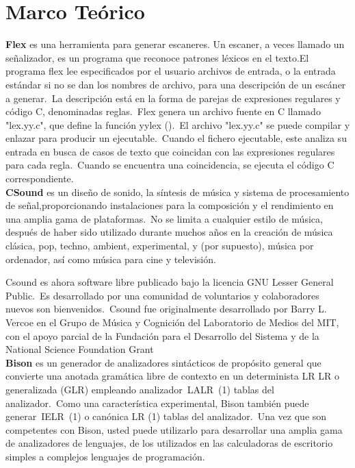 \documentclass[12pt]{article}
\begin{document}
\section{Marco Teórico}
{\bf Flex} es una herramienta para generar escaneres. Un escaner, a veces llamado un señalizador, es un programa que reconoce patrones léxicos en el texto.El programa flex lee especificados por el usuario archivos de entrada, o la entrada estándar si no se dan los nombres de archivo, para una descripción de un escáner a generar. La descripción está en la forma de parejas de expresiones regulares y código C, denominadas reglas. Flex genera un archivo fuente en C llamado "lex.yy.c", que define la función yylex (). El archivo "lex.yy.c" se puede compilar y enlazar para producir un ejecutable. Cuando el fichero ejecutable, este analiza su entrada en busca de casos de texto que coincidan con las expresiones regulares para cada regla. Cuando se encuentra una coincidencia, se ejecuta el código C correspondiente. \\


{\bf CSound} es un diseño de sonido, la síntesis de música y sistema de procesamiento de señal,proporcionando instalaciones para la composición y el rendimiento en una amplia gama de plataformas. No se limita a cualquier estilo de música, después de haber sido utilizado durante muchos años en la creación de música clásica, pop, techno, ambient, experimental, y (por supuesto), música por ordenador, así como música para cine y televisión.

Csound es ahora software libre publicado bajo la licencia GNU Lesser General Public. Es desarrollado por una comunidad de voluntarios y colaboradores nuevos son bienvenidos. Csound fue originalmente desarrollado por Barry L. Vercoe en el Grupo de Música y Cognición del Laboratorio de Medios del MIT, con el apoyo parcial de la Fundación para el Desarrollo del Sistema y de la National Science Foundation Grant\\

{\bf Bison} es un generador de analizadores sintácticos de propósito general que convierte una anotada gramática libre de contexto en un determinista LR LR o generalizada (GLR) empleando analizador LALR (1) tablas del analizador. Como una característica experimental, Bison también puede generar IELR (1) o canónica LR (1) tablas del analizador. Una vez que son competentes con Bison, usted puede utilizarlo para desarrollar una amplia gama de analizadores de lenguajes, de los utilizados en las calculadoras de escritorio simples a complejos lenguajes de programación.\\
\end{document}
